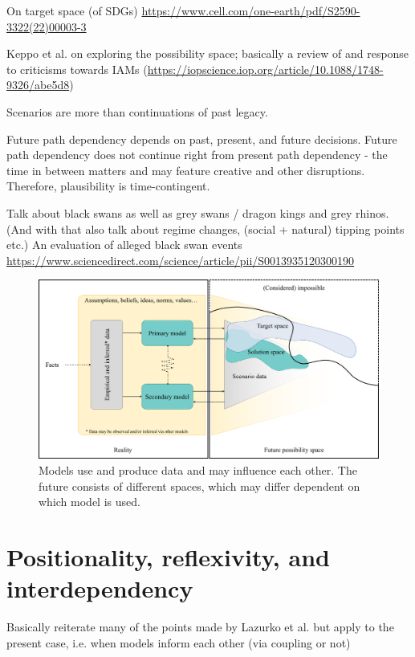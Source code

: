 \documentclass{article}
\begin{document}
\begin{refsection}
On target space (of SDGs) \url{https://www.cell.com/one-earth/pdf/S2590-3322(22)00003-3}

Keppo et al. on exploring the possibility space; basically a review of and response to criticisms towards IAMs (\url{https://iopscience.iop.org/article/10.1088/1748-9326/abe5d8})

Scenarios are more than continuations of past legacy.

Future path dependency depends on past, present, and future decisions. Future path dependency does not continue right from present path dependency - the time in between matters and may feature creative and other disruptions. Therefore, plausibility is time-contingent.

Talk about black swans as well as grey swans / dragon kings and grey rhinos. 
(And with that also talk about regime changes, (social + natural) tipping points etc.)
An evaluation of alleged black swan events \url{https://www.sciencedirect.com/science/article/pii/S0013935120300190}


\begin{figure} [ht]
    \includegraphics[width=\textwidth]{Model_spaces.png} 
    \caption[Another caption for list of figures]{Models use and produce data and may influence each other. The future consists of different spaces, which may differ dependent on which model is used.}
    \label{fig:model_spaces}
\end{figure}


\label{main_part}
\section{Positionality, reflexivity, and interdependency}

Basically reiterate many of the points made by Lazurko et al. but apply to the present case, i.e. when models inform each other (via coupling or not)


\end{refsection}
\end{document}
